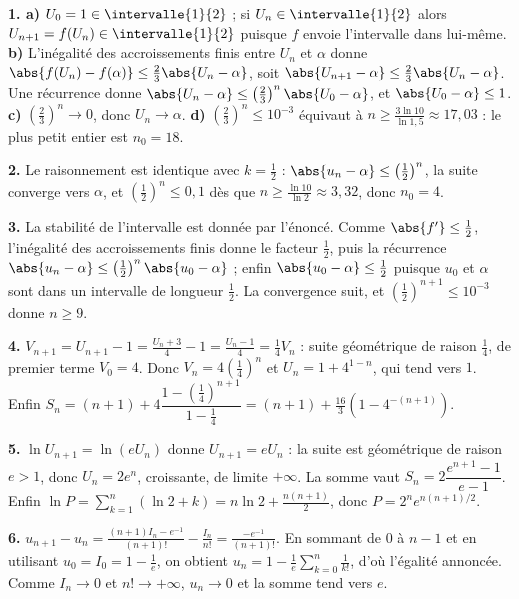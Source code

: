 \begin{corrige}[annales]
\textbf{1. a)} $U_{0} = 1 \in \intervalle{1}{2}$ ; si $U_{n} \in
\intervalle{1}{2}$ alors $U_{n+1} = f(U_{n}) \in \intervalle{1}{2}$ puisque
$f$ envoie l'intervalle dans lui-même.
\textbf{b)} L'inégalité des accroissements finis entre $U_{n}$ et $\alpha$
donne $\abs{f(U_{n})-f(\alpha)} \leq \frac23\abs{U_{n}-\alpha}$, soit
$\abs{U_{n+1}-\alpha} \leq \frac23\abs{U_{n}-\alpha}$. Une récurrence donne
$\abs{U_{n}-\alpha} \leq \left(\frac23\right)^{n}\abs{U_{0}-\alpha}$, et
$\abs{U_{0}-\alpha} \leq 1$.
\textbf{c)} $\left(\frac23\right)^{n} \to 0$, donc $U_{n} \to \alpha$.
\textbf{d)} $\left(\frac23\right)^{n} \leq 10^{-3}$ équivaut à
$n \geq \frac{3\ln10}{\ln1{,}5} \approx 17{,}03$ : le plus petit entier est
$n_{0} = 18$.

\textbf{2.} Le raisonnement est identique avec $k = \frac12$ :
$\abs{u_{n}-\alpha} \leq \left(\frac12\right)^{n}$, la suite converge vers
$\alpha$, et $\left(\frac12\right)^{n} \leq 0{,}1$ dès que
$n \geq \frac{\ln10}{\ln2} \approx 3{,}32$, donc $n_{0} = 4$.

\textbf{3.} La stabilité de l'intervalle est donnée par l'énoncé. Comme
$\abs{f'} \leq \frac12$, l'inégalité des accroissements finis donne le
facteur $\frac12$, puis la récurrence
$\abs{u_{n}-\alpha} \leq \left(\frac12\right)^{n}\abs{u_{0}-\alpha}$ ; enfin
$\abs{u_{0}-\alpha} \leq \frac12$ puisque $u_{0}$ et $\alpha$ sont dans un
intervalle de longueur $\frac12$. La convergence suit, et
$\left(\frac12\right)^{n+1} \leq 10^{-3}$ donne $n \geq 9$.

\textbf{4.} $V_{n+1} = U_{n+1}-1 = \frac{U_{n}+3}{4}-1 = \frac{U_{n}-1}{4}
= \frac14V_{n}$ : suite géométrique de raison $\frac14$, de premier terme
$V_{0} = 4$. Donc $V_{n} = 4\left(\frac14\right)^{n}$ et
$U_{n} = 1+4^{1-n}$, qui tend vers $1$. Enfin
$S_{n} = (n+1)+4\dfrac{1-\left(\frac14\right)^{n+1}}{1-\frac14}
= (n+1)+\frac{16}{3}\left(1-4^{-(n+1)}\right)$.

\textbf{5.} $\ln U_{n+1} = \ln(eU_{n})$ donne $U_{n+1} = eU_{n}$ : la suite
est géométrique de raison $e>1$, donc $U_{n} = 2e^{n}$, croissante, de limite
$+\infty$. La somme vaut $S_{n} = 2\dfrac{e^{n+1}-1}{e-1}$. Enfin
$\ln P = \sum_{k=1}^{n}\left(\ln2+k\right) = n\ln2+\frac{n(n+1)}{2}$, donc
$P = 2^{n}e^{n(n+1)/2}$.

\textbf{6.} $u_{n+1}-u_{n} = \frac{(n+1)I_{n}-e^{-1}}{(n+1)!}
-\frac{I_{n}}{n!} = \frac{-e^{-1}}{(n+1)!}$. En sommant de $0$ à $n-1$ et en
utilisant $u_{0} = I_{0} = 1-\frac1e$, on obtient
$u_{n} = 1-\frac1e\sum_{k=0}^{n}\frac{1}{k!}$, d'où l'égalité annoncée. Comme
$I_{n} \to 0$ et $n! \to +\infty$, $u_{n} \to 0$ et la somme tend vers $e$.


\end{corrige}
